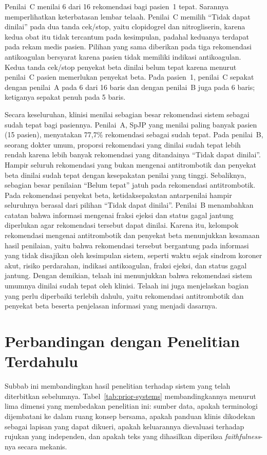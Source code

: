 Penilai~C menilai 6 dari 16 rekomendasi bagi pasien~1 tepat. Sarannya memperlihatkan
keterbatasan lembar telaah. Penilai~C memilih ``Tidak dapat dinilai'' pada dua tanda
cek/stop, yaitu clopidogrel dan nitrogliserin, karena kedua obat itu tidak tercantum pada
kesimpulan, padahal keduanya terdapat pada rekam medis pasien. Pilihan yang sama diberikan
pada tiga rekomendasi antikoagulan bersyarat karena pasien tidak memiliki indikasi
antikoagulan. Kedua tanda cek/stop penyekat beta dinilai belum tepat karena menurut penilai~C
pasien memerlukan penyekat beta. Pada pasien~1, penilai~C sepakat dengan penilai~A pada 6 dari
16 baris dan dengan penilai~B juga pada 6 baris; ketiganya sepakat penuh pada 5 baris.

Secara keseluruhan, klinisi menilai sebagian besar rekomendasi sistem sebagai sudah tepat
bagi pasiennya. Penilai~A, SpJP yang menilai paling banyak pasien (15 pasien), menyatakan
77,7\% rekomendasi sebagai sudah tepat. Pada penilai~B, seorang dokter umum, proporsi
rekomendasi yang dinilai sudah tepat lebih rendah karena lebih banyak rekomendasi yang
ditandainya ``Tidak dapat dinilai''. Hampir seluruh rekomendasi yang bukan mengenai
antitrombotik dan penyekat beta dinilai sudah tepat dengan kesepakatan penilai yang tinggi.
Sebaliknya, sebagian besar penilaian ``Belum tepat'' jatuh pada rekomendasi antitrombotik.
Pada rekomendasi penyekat beta, ketidaksepakatan antarpenilai hampir seluruhnya berasal dari
pilihan ``Tidak dapat dinilai''. Penilai~B menambahkan catatan bahwa informasi mengenai
fraksi ejeksi dan status gagal jantung diperlukan agar rekomendasi tersebut dapat dinilai.
Karena itu, kelompok rekomendasi mengenai antitrombotik dan penyekat beta menunjukkan
kesamaan hasil penilaian, yaitu bahwa rekomendasi tersebut bergantung pada informasi yang
tidak disajikan oleh kesimpulan sistem, seperti waktu sejak sindrom koroner akut, risiko
perdarahan, indikasi antikoagulan, fraksi ejeksi, dan status gagal jantung. Dengan demikian,
telaah ini menunjukkan bahwa rekomendasi sistem umumnya dinilai sudah tepat oleh klinisi.
Telaah ini juga menjelaskan bagian yang perlu diperbaiki terlebih dahulu, yaitu rekomendasi
antitrombotik dan penyekat beta beserta penjelasan informasi yang menjadi dasarnya.

\section{Perbandingan dengan Penelitian Terdahulu}
\label{sec:prior-work}

Subbab ini membandingkan hasil penelitian terhadap sistem yang telah diterbitkan sebelumnya.
Tabel~\ref{tab:prior-systems} membandingkannya menurut lima dimensi yang membedakan penelitian
ini: sumber data, apakah terminologi dijembatani ke dalam ruang konsep bersama, apakah panduan
klinis dikodekan sebagai lapisan yang dapat dikueri, apakah keluarannya dievaluasi terhadap
rujukan yang independen, dan apakah teks yang dihasilkan diperiksa \emph{faithfulness}-nya
secara mekanis.


